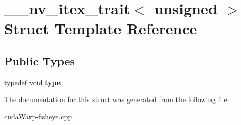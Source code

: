 \hypertarget{struct____nv__itex__trait_3_01unsigned_01_4}{}\section{\+\_\+\+\_\+nv\+\_\+itex\+\_\+trait$<$ unsigned $>$ Struct Template Reference}
\label{struct____nv__itex__trait_3_01unsigned_01_4}
\subsection*{Public Types}
\begin{DoxyCompactItemize}
\item 
typedef void {\bfseries type}\hypertarget{struct____nv__itex__trait_3_01unsigned_01_4_acc3cd77b41c757adf4761a523685f702}{}\label{struct____nv__itex__trait_3_01unsigned_01_4_acc3cd77b41c757adf4761a523685f702}

\end{DoxyCompactItemize}


The documentation for this struct was generated from the following file\+:\begin{DoxyCompactItemize}
\item 
cuda\+Warp-\/fisheye.\+cpp\end{DoxyCompactItemize}
